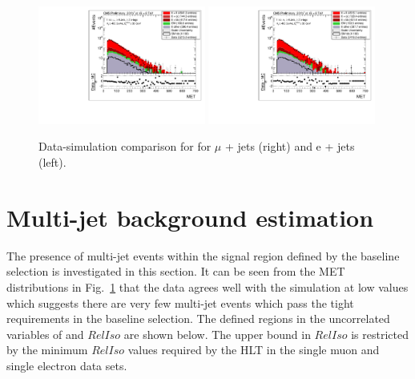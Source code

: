 \begin{figure}[ht!]
\centering
    \includegraphics[width=0.49\textwidth]{images/Run1/MET_StackLogY_Mu.pdf}
     \includegraphics[width=0.49\textwidth]{images/Run1/MET_StackLogY_e.pdf}          
    \caption{Data-simulation comparison for \MET for $\mu$ + jets (right) and e + jets (left). }
    \label{fig:datasimMET}
\end{figure}



\section{Multi-jet background estimation}
\label{sec:QCDbackground}
The presence of multi-jet events within the signal region defined by the baseline selection is investigated in this section. 
It can be seen from the MET distributions in Fig.~\ref{fig:datasimMET} that the data agrees well with the simulation at low values which suggests there are very few multi-jet events which pass the tight requirements in the baseline selection. 
The defined regions in the uncorrelated variables of \MET and $RelIso$ are shown below. The upper bound in $RelIso$ is restricted by the minimum $RelIso$ values required by the HLT in the single muon and single electron data sets.\\

